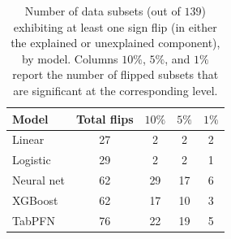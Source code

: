 
\begin{table}[!ht]
    \caption{Number of data subsets (out of $139$) exhibiting at least one sign flip (in either the explained or unexplained component), by model. Columns $10\%$, $5\%$, and $1\%$ report the number of flipped subsets that are significant at the corresponding level.}
    \label{tab:flip_summary_main}
    \centering
    \small
    \begin{tabular}{lcccc}
    \toprule
    Model & Total flips & $10\%$ & $5\%$ & $1\%$ \\
    \midrule
    Linear      & 27 &  2 &  2 &  2 \\
    Logistic    & 29 &  2 &  2 &  1 \\
    Neural net  & 62 & 29 & 17 &  6 \\
    XGBoost     & 62 & 17 & 10 & 3 \\
    TabPFN     & 76 & 22 & 19 & 5 \\
    \bottomrule
    \end{tabular}
\end{table}

